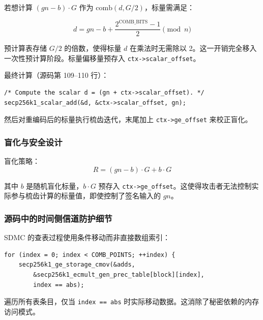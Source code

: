\documentclass[a4paper,12pt]{ctexart}
\begin{document}
若想计算 $(gn-b) \cdot G$ 作为 $\text{comb}(d, G/2)$，标量需满足：

\begin{equation}
d = gn - b + \frac{2^{\text{COMB\_BITS}} - 1}{2} \pmod{n}
\end{equation}

预计算表存储 $G/2$ 的倍数，使得标量 $d$ 在乘法时无需除以 2。这一开销完全移入一次性预计算阶段。标量偏移量预存入 \texttt{ctx->scalar\_offset}。

最终计算（源码第 109--110 行）：

\begin{codebox}
\begin{verbatim}
/* Compute the scalar d = (gn + ctx->scalar_offset). */
secp256k1_scalar_add(&d, &ctx->scalar_offset, gn);
\end{verbatim}
\end{codebox}

然后对重编码后的标量执行梳齿迭代，末尾加上 \texttt{ctx->ge\_offset} 来校正盲化。

\subsubsection{盲化与安全设计}

盲化策略：
\begin{equation}
R = (gn - b) \cdot G + b \cdot G
\end{equation}

其中 $b$ 是随机盲化标量，$b \cdot G$ 预存入 \texttt{ctx->ge\_offset}。这使得攻击者无法控制实际参与梳齿计算的标量值，即使控制了签名输入的 $gn$。

\subsubsection{源码中的时间侧信道防护细节}

SDMC 的查表过程使用条件移动而非直接数组索引：
\begin{codebox}
\begin{verbatim}
for (index = 0; index < COMB_POINTS; ++index) {
    secp256k1_ge_storage_cmov(&adds,
        &secp256k1_ecmult_gen_prec_table[block][index],
        index == abs);
\end{verbatim}
\end{codebox}


遍历所有表条目，仅当 \texttt{index == abs} 时实际移动数据。这消除了秘密依赖的内存访问模式。

\end{document}
